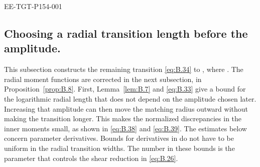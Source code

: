 %
\begin{EESegment}{EE-TGT-P154-001}
\subsection{Choosing a radial transition length before the amplitude.}\label{sec:B.7}
This subsection constructs the remaining transition \eqref{eq:B.34} to
, where
. The radial moment functions are corrected in the next
subsection, in Proposition~\ref{prop:B.8}. First, Lemma~\ref{lem:B.7} and \eqref{eq:B.33} give a
bound for the logarithmic radial length  that does not depend on
the amplitude  chosen later. Increasing that amplitude can then move
the matching radius  outward without making the transition longer. This
makes the normalized discrepancies in the inner moments small, as shown in \eqref{eq:B.38} and
\eqref{eq:B.39}. The estimates below concern parameter derivatives. Bounds for derivatives in
 do not have to be uniform in the radial transition widths. The number
 in these bounds is the parameter that controls the shear
reduction in \eqref{eq:B.26}.
\end{EESegment}


